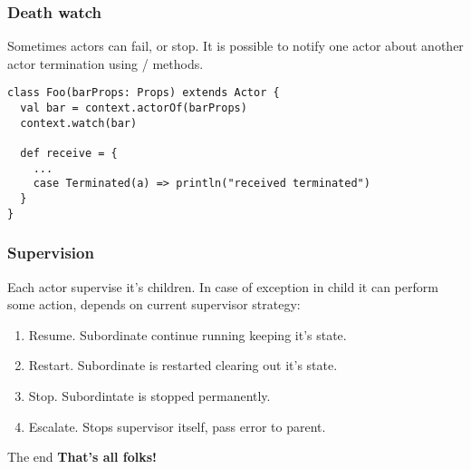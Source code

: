 \documentclass{beamer}
\begin{document}
\begin{frame}[fragile]
\frametitle{Death watch}
Sometimes actors can fail, or stop. It is possible to notify one actor about another actor
termination using  /  methods.
\begin{lstlisting}
class Foo(barProps: Props) extends Actor {
  val bar = context.actorOf(barProps)
  context.watch(bar)

  def receive = {
    ...
    case Terminated(a) => println("received terminated")
  }
}
\end{lstlisting}
\end{frame}

\begin{frame}[fragile]
\frametitle{Supervision}
Each actor supervise it's children.  In case of exception in child it can perform some action,
depends on current supervisor strategy:
\begin{enumerate}
\item Resume. Subordinate continue running keeping it's state.
\item Restart. Subordinate is restarted clearing out it's state.
\item Stop. Subordintate is stopped permanently.
\item Escalate. Stops supervisor itself, pass error to parent.
\end{enumerate}
\end{frame}

\begin{frame}{The end}
\centering
\textbf{That's all folks!}
\end{frame}
\end{document}
